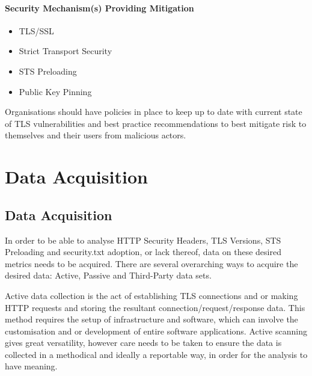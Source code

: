 \documentclass{mscreport}
\begin{document}
\subsubsection{Security Mechanism(s) Providing Mitigation}

\begin{itemize}
	\setlength\itemsep{0.1em}
	\item TLS/SSL
	\item Strict Transport Security
	\item STS Preloading
	\item Public Key Pinning
\end{itemize}

Organisations should have policies in place to keep up to date with current state of TLS vulnerabilities and best practice recommendations to best mitigate risk to themselves and their users from malicious actors.
\clearpage
\newpage

%

\chapter{Data Acquisition}
\label{chap:data_acqusition}

\section{Data Acquisition}
\label{section:data_aquisition}

In order to be able to analyse HTTP Security Headers, TLS Versions, STS Preloading and security.txt adoption, or lack thereof, data on these desired metrics needs to be acquired. There are several overarching ways to acquire the desired data: Active, Passive and Third-Party data sets.

\vspace{0.3cm} \noindent
Active data collection is the act of establishing TLS connections and or making HTTP requests and storing the resultant connection/request/response data. This method requires the setup of infrastructure and software, which can involve the customisation and or development of entire software applications. Active scanning gives great versatility, however care needs to be taken to ensure the data is collected in a methodical and ideally a reportable way, in order for the analysis to have meaning.
\end{document}
